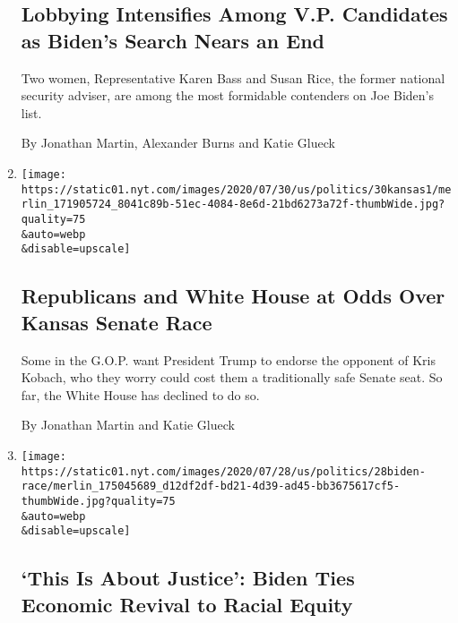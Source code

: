 \begin{enumerate}
  \hypertarget{lobbying-intensifies-among-vp-candidates-as-bidens-search-nears-an-end}{%
  \subsection{Lobbying Intensifies Among V.P. Candidates as Biden's
  Search Nears an
  End}\label{lobbying-intensifies-among-vp-candidates-as-bidens-search-nears-an-end}}

  Two women, Representative Karen Bass and Susan Rice, the former
  national security adviser, are among the most formidable contenders on
  Joe Biden's list.

  By Jonathan Martin, Alexander Burns and Katie Glueck
\item
  \href{/2020/07/30/us/politics/kansas-senate-kobach-trump.html}{}

  \texttt{[image: https://static01.nyt.com/images/2020/07/30/us/politics/30kansas1/merlin\_171905724\_8041c89b-51ec-4084-8e6d-21bd6273a72f-thumbWide.jpg?quality=75\\\&auto=webp\\\&disable=upscale]}

  \hypertarget{republicans-and-white-house-at-odds-over-kansas-senate-race}{%
  \subsection{Republicans and White House at Odds Over Kansas Senate
  Race}\label{republicans-and-white-house-at-odds-over-kansas-senate-race}}

  Some in the G.O.P. want President Trump to endorse the opponent of
  Kris Kobach, who they worry could cost them a traditionally safe
  Senate seat. So far, the White House has declined to do so.

  By Jonathan Martin and Katie Glueck
\item
  \href{/2020/07/28/us/politics/joe-biden-racial-justice-economy-plan.html}{}

  \texttt{[image: https://static01.nyt.com/images/2020/07/28/us/politics/28biden-race/merlin\_175045689\_d12df2df-bd21-4d39-ad45-bb3675617cf5-thumbWide.jpg?quality=75\\\&auto=webp\\\&disable=upscale]}

  \hypertarget{this-is-about-justice-biden-ties-economic-revival-to-racial-equity}{%
  \subsection{`This Is About Justice': Biden Ties Economic Revival to
  Racial
  Equity}\label{this-is-about-justice-biden-ties-economic-revival-to-racial-equity}}


\end{enumerate}
